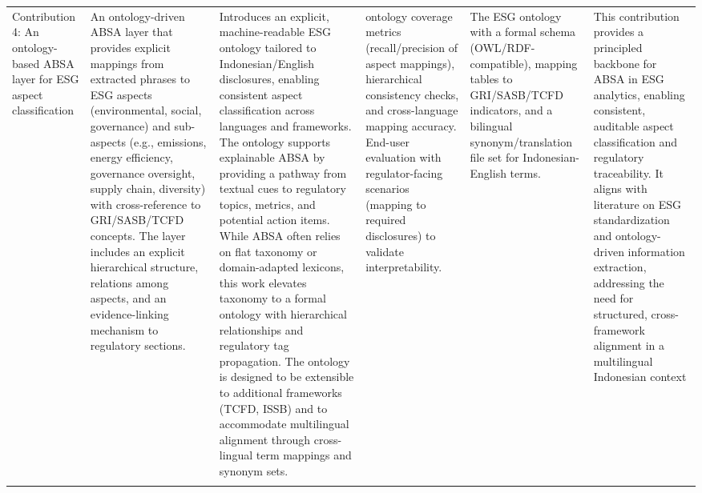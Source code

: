\begin{landscape}
\begin{longtable}{p{2cm} p{3cm} p{6cm} p{3cm} p{3cm} p{6cm}}
Contribution 4: An ontology-based ABSA layer for ESG aspect classification & An ontology-driven ABSA layer that provides explicit mappings from extracted phrases to ESG aspects (environmental, social, governance) and sub-aspects (e.g., emissions, energy efficiency, governance oversight, supply chain, diversity) with cross-reference to GRI/SASB/TCFD concepts. The layer includes an explicit hierarchical structure, relations among aspects, and an evidence-linking mechanism to regulatory sections. & Introduces an explicit, machine-readable ESG ontology tailored to Indonesian/English disclosures, enabling consistent aspect classification across languages and frameworks. The ontology supports explainable ABSA by providing a pathway from textual cues to regulatory topics, metrics, and potential action items. While ABSA often relies on flat taxonomy or domain-adapted lexicons, this work elevates taxonomy to a formal ontology with hierarchical relationships and regulatory tag propagation. The ontology is designed to be extensible to additional frameworks (TCFD, ISSB) and to accommodate multilingual alignment through cross-lingual term mappings and synonym sets. & ontology coverage metrics (recall/precision of aspect mappings), hierarchical consistency checks, and cross-language mapping accuracy. End-user evaluation with regulator-facing scenarios (mapping to required disclosures) to validate interpretability. & The ESG ontology with a formal schema (OWL/RDF-compatible), mapping tables to GRI/SASB/TCFD indicators, and a bilingual synonym/translation file set for Indonesian-English terms. & This contribution provides a principled backbone for ABSA in ESG analytics, enabling consistent, auditable aspect classification and regulatory traceability. It aligns with literature on ESG standardization and ontology-driven information extraction, addressing the need for structured, cross-framework alignment in a multilingual Indonesian context \cite{10.1108/medar-11-2020-1097,10.1108/aaaj-06-2021-5330,10.1108/aaaj-02-2020-4445,10.1111/1911-3838.12232,10.20900/jsr20210006} \\
\addlinespace

\end{longtable}
\end{landscape}

